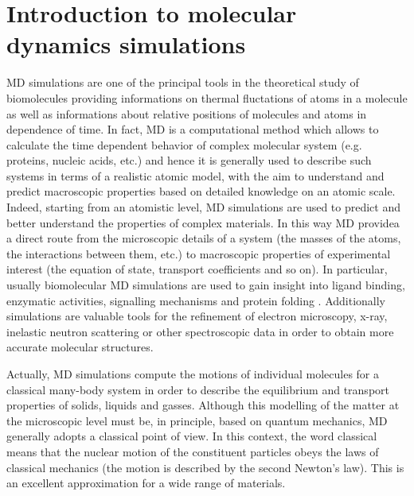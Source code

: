 
\section{Introduction to molecular dynamics simulations}
MD simulations are one of the principal tools in the theoretical study of biomolecules providing informations on thermal fluctations of atoms in a molecule as well as informations about relative positions of molecules and atoms in dependence of time. In fact, MD is a computational method which allows to calculate the time dependent behavior of complex molecular system (e.g. proteins, nucleic acids, etc.) and hence it is generally used to describe such systems in terms of a realistic atomic model, with the aim to understand and predict macroscopic properties based on detailed knowledge on an atomic scale. Indeed, starting from an atomistic level, MD simulations are used to predict and better understand the properties of complex materials. In this way MD providea a direct route from the microscopic details of a system (the masses of the atoms, the interactions between them, etc.) to macroscopic properties of experimental interest (the equation of state, transport coefficients and so on). In particular, usually biomolecular MD simulations are used to gain insight into ligand binding, enzymatic activities, signalling mechanisms and protein folding \cite{ref:NAMD-VMD_Kukol}. Additionally simulations are valuable tools for the refinement of electron microscopy, x-ray, inelastic neutron scattering or other spectroscopic data in order to obtain more accurate molecular structures.

Actually, MD simulations compute the motions of individual molecules for a classical many-body system in order to describe the equilibrium and transport properties of solids, liquids and gasses.
Although this modelling of the matter at the microscopic level must be, in principle, based on quantum mechanics, MD generally adopts a classical point of view.
In this context, the word classical means that the nuclear motion of the constituent particles obeys the laws of classical mechanics (the motion is described by the second Newton's law).
This is an excellent approximation for a wide range of materials.


